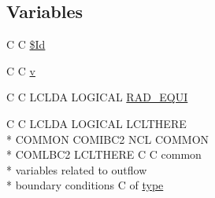 \subsection*{Variables}
\begin{DoxyCompactItemize}
\item 
C C \hyperlink{home_2abonfi_2_c_f_d__codes_2_eul_f_s_83_84_2include_2ibc2_8com_af40bd3a96fc1553c00422342f92046b8}{\$\-Id}
\item 
C C \hyperlink{home_2abonfi_2_c_f_d__codes_2_eul_f_s_83_84_2include_2ibc2_8com_a8961853e9a171af64fe80e35da93a2e0}{v}
\item 
C C L\-C\-L\-D\-A L\-O\-G\-I\-C\-A\-L \hyperlink{home_2abonfi_2_c_f_d__codes_2_eul_f_s_83_84_2include_2ibc2_8com_a5e52771773c3d7155ccec9942c9d7d87}{R\-A\-D\-\_\-\-E\-Q\-U\-I}
\item 
C C L\-C\-L\-D\-A L\-O\-G\-I\-C\-A\-L L\-C\-L\-T\-H\-E\-R\-E \\*
C\-O\-M\-M\-O\-N C\-O\-M\-I\-B\-C2 N\-C\-L C\-O\-M\-M\-O\-N \\*
C\-O\-M\-L\-B\-C2 L\-C\-L\-T\-H\-E\-R\-E C C common \\*
variables related to outflow \\*
boundary conditions C of \hyperlink{home_2abonfi_2_c_f_d__codes_2_eul_f_s_83_84_2include_2ibc2_8com_a2b68f0032c5a5129886c29c634a37223}{type}
\end{DoxyCompactItemize}


